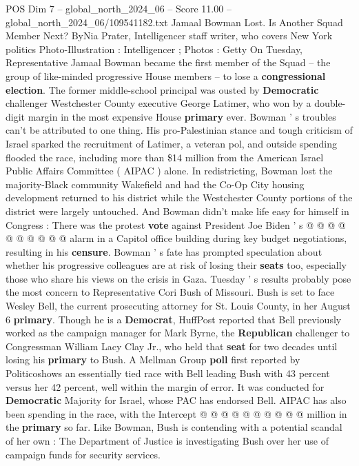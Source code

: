 \begin{textsample}{POS Dim 7 – global\_north\_2024\_06 – Score 11.00 – global\_north\_2024\_06/109541182.txt}  \label{ex:f7_pos_088}
Jamaal Bowman Lost.
Is Another Squad Member Next?
ByNia Prater, Intelligencer staff writer, who covers New York politics Photo-Illustration : Intelligencer ; Photos : Getty On Tuesday, Representative Jamaal Bowman became the first member of the Squad -- the group of like-minded progressive House members -- to lose a \textbf{congressional} \textbf{election}.
The former middle-school principal was ousted by \textbf{Democratic} challenger Westchester County executive George Latimer, who won by a double-digit margin in the most expensive House \textbf{primary} ever.
Bowman ' s troubles can't be attributed to one thing.
His pro-Palestinian stance and tough criticism of Israel sparked the recruitment of Latimer, a veteran pol, and outside spending flooded the race, including more than \$14 million from the American Israel Public Affairs Committee ( AIPAC ) alone.
In redistricting, Bowman lost the majority-Black community Wakefield and had the Co-Op City housing development returned to his district while the Westchester County portions of the district were largely untouched.
And Bowman didn't make life easy for himself in Congress : There was the protest \textbf{vote} against President Joe Biden ' s @ @ @ @ @ @ @ @ @ @ alarm in a Capitol office building during key budget negotiations, resulting in his \textbf{censure}.
Bowman ' s fate has prompted speculation about whether his progressive colleagues are at risk of losing their \textbf{seats} too, especially those who share his views on the crisis in Gaza.
Tuesday ' s results probably pose the most concern to Representative Cori Bush of Missouri.
Bush is set to face Wesley Bell, the current prosecuting attorney for St.
Louis County, in her August 6 \textbf{primary}.
Though he is a \textbf{Democrat}, HuffPost reported that Bell previously worked as the campaign manager for Mark Byrne, the \textbf{Republican} challenger to Congressman William Lacy Clay Jr., who held that \textbf{seat} for two decades until losing his \textbf{primary} to Bush.
A Mellman Group \textbf{poll} first reported by Politicoshows an essentially tied race with Bell leading Bush with 43 percent versus her 42 percent, well within the margin of error.
It was conducted for \textbf{Democratic} Majority for Israel, whose PAC has endorsed Bell.
AIPAC has also been spending in the race, with the Intercept @ @ @ @ @ @ @ @ @ @ million in the \textbf{primary} so far.
Like Bowman, Bush is contending with a potential scandal of her own : The Department of Justice is investigating Bush over her use of campaign funds for security services.

\end{textsample}
